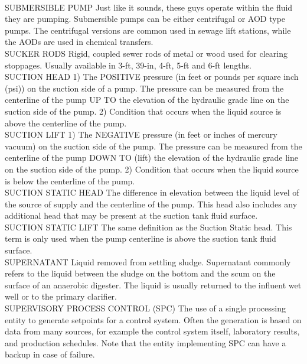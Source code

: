 \documentclass{article}
\begin{document}
\vspace{0.3cm}\\
SUBMERSIBLE PUMP
Just like it sounds, these guys operate within the fluid they are pumping. Submersible pumps can be either centrifugal or AOD type pumps. The centrifugal versions are common used in sewage lift stations, while the AODs are used in chemical transfers.
\vspace{0.3cm}\\
SUCKER RODS
Rigid, coupled sewer rods of metal or wood used for clearing stoppages. Usually available in 3-ft, 39-in, 4-ft, 5-ft and 6-ft lengths. 
\vspace{0.3cm}\\
SUCTION HEAD
1) The POSITIVE pressure (in feet or pounds per square inch (psi)) on the suction side of a pump. The pressure can be measured from the centerline of the pump UP TO the elevation of the hydraulic grade line on the suction side of the pump. 2)  Condition that occurs when the liquid source is above the centerline of the pump.
\vspace{0.3cm}\\
SUCTION LIFT
1) The NEGATIVE pressure (in feet or inches of mercury vacuum) on the suction side of the pump. The pressure can be measured from the centerline of the pump DOWN TO (lift) the elevation of the hydraulic grade line on the suction side of the pump. 2) Condition that occurs when the liquid source is below the centerline of the pump.
\vspace{0.3cm}\\
SUCTION STATIC HEAD
The difference in elevation between the liquid level of the source of supply and the centerline of the pump. This head also includes any additional head that may be present at the suction tank fluid surface.
\vspace{0.3cm}\\
SUCTION STATIC LIFT
The same definition as the Suction Static head. This term is only used when the pump centerline is above the suction tank fluid surface.
\vspace{0.3cm}\\
SUPERNATANT
Liquid removed from settling sludge. Supernatant commonly refers to the liquid between the sludge on the bottom and the scum on the surface of an anaerobic digester. The liquid is usually returned to the influent wet well or to the primary clarifier.
\vspace{0.3cm}\\
SUPERVISORY PROCESS CONTROL (SPC)
The use of a single processing entity to generate setpoints for a control system. Often the generation is based on data from many sources, for example the control system itself, laboratory results, and production schedules. Note that the entity implementing SPC can have a backup in case of failure.
\vspace{0.3cm}\\
\end{document}
